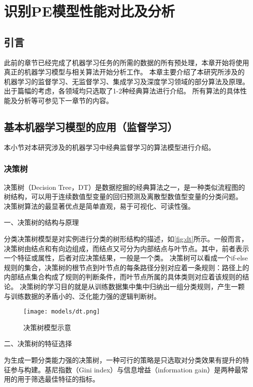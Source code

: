 \chapter{识别PE模型性能对比及分析}
\section{引言}
此前的章节已经完成了机器学习任务的所需的数据的所有预处理，本章开始将使用真正的机器学习模型与相关算法开始分析工作。
本章主要介绍了本研究所涉及的机器学习的监督学习、无监督学习、集成学习及深度学习领域的部分算法及原理。出于篇幅的考虑，各领域均只选取了1-2种经典算法进行介绍。
所有算法的具体性能及分析等可参见下一章节的内容。

\section{基本机器学习模型的应用（监督学习）}
本小节对本研究涉及的机器学习中经典监督学习的算法模型进行介绍。

\subsection{决策树}
决策树（Decision Tree，DT）是数据挖掘的经典算法之一，是一种类似流程图的树结构，可以用于连续数值型变量的回归预测及离散型数值型变量的分类问题\cite{Li2017,Liu2018}。
决策树算法的最显著优点是简单直观，易于可视化、可读性强。

一、决策树的结构与原理

分类决策树模型是对实例进行分类的树形结构的描述，如\autoref{fig:dt}所示。一般而言，决策树由结点和有向边组成，而结点又可分为内部结点与叶节点。其中，前者表示一个特征或属性，后者对应决策结果，一般是一个类\cite{Li2017,Zhou2016}。
决策树可以看成一个if-else规则的集合，决策树的根节点到叶节点的每条路径分别对应着一条规则：路径上的内部结点集合构成了规则的判断条件，而叶节点所属的具体类则对应着该规则的结论。
决策树的学习目的就是从训练数据集中集中归纳出一组分类规则，产生一颗与训练数据的矛盾小的、泛化能力强的逻辑判断树。
\begin{figure}[htbp]
    \centering
    \texttt{[image: models/dt.png]}
    \caption{\label{fig:dt}决策树模型示意}
\end{figure}

二、决策树的特征选择

为生成一颗分类能力强的决策树，一种可行的策略是只选取对分类效果有提升的特征参与构建。基尼指数（Gini index）与信息增益（information gain）是两种最常用的用于筛选最佳特征的指标。


